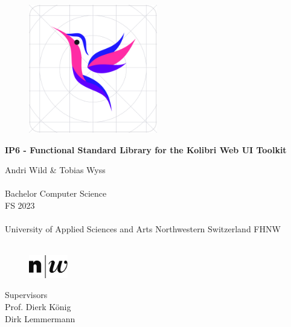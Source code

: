 






\begin{titlepage}
\begin{center}

    \begin{figure}[H]
        \centering
        \includegraphics[width=0.50\textwidth]{./frontmatter/pictures/kolibri-logo}
    \end{figure}

    \vspace*{1cm}
    {\huge \bfseries IP6 - Functional Standard Library for the Kolibri Web UI
    Toolkit  \\ }
    \vspace{2cm}
    {\large 
      Andri Wild \& Tobias Wyss\\

    	~\\
    	Bachelor Computer Science\\
    	\vspace{2.0cm}
    	FS 2023\\
    	~\\
    	University of Applied Sciences and Arts Northwestern Switzerland FHNW\\
        ~\\
    \begin{figure}[H]
        \centering
        \includegraphics[width=0.15\textwidth]{./frontmatter/pictures/fhnw_e_10mm.jpg}
    \end{figure}
    }




{\large
	Supervisors \\[\baselineskip]
	Prof. Dierk König\\
	Dirk Lemmermann\\[1cm]
}
\end{center}
\end{titlepage}

\begin{titlepage}
\thispagestyle{empty}
\newpage
\mbox{}
\end{titlepage}
